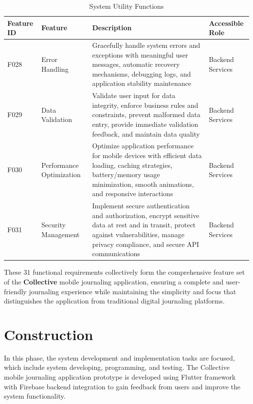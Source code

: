 \newpage

\begin{table}[H]
\centering
\caption{System Utility Functions}
\label{tab:system-utility-functions}
\begin{tabular}{|p{0.8cm}|p{2.2cm}|p{9.5cm}|p{1.5cm}|}
\hline
\textbf{Feature ID} & \textbf{Feature} & \textbf{Description} & \textbf{Accessible Role} \\
\hline
F028 & Error Handling & Gracefully handle system errors and exceptions with meaningful user messages, automatic recovery mechanisms, debugging logs, and application stability maintenance & Backend Services \\
\hline
F029 & Data Validation & Validate user input for data integrity, enforce business rules and constraints, prevent malformed data entry, provide immediate validation feedback, and maintain data quality & Backend Services \\
\hline
F030 & Performance Optimization & Optimize application performance for mobile devices with efficient data loading, caching strategies, battery/memory usage minimization, smooth animations, and responsive interactions & Backend Services \\
\hline
F031 & Security Management & Implement secure authentication and authorization, encrypt sensitive data at rest and in transit, protect against vulnerabilities, manage privacy compliance, and secure API communications & Backend Services \\
\hline
\end{tabular}
\end{table}

These 31 functional requirements collectively form the comprehensive feature set of the \textbf{Collective} mobile journaling application, ensuring a complete and user-friendly journaling experience while maintaining the simplicity and focus that distinguishes the application from traditional digital journaling platforms.

\section{Construction}\label{sec:construction}

In this phase, the system development and implementation tasks are focused, which include system developing, programming, and testing. The Collective mobile journaling application prototype is developed using Flutter framework with Firebase backend integration to gain feedback from users and improve the system functionality.

